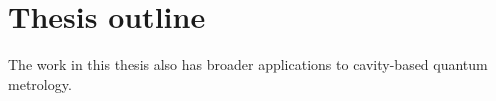 


\section{Thesis outline}





The work in this thesis also has broader applications to cavity-based quantum metrology.




